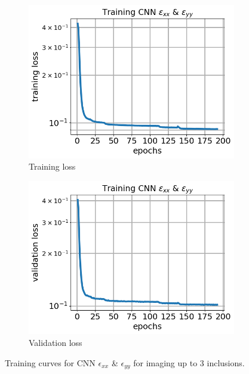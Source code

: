 \documentclass[12pt]{article}
\newcommand{\nhgfigheight}{4.0cm}
\begin{document}
\begin{figure}[h]
  \centering
  \begin{subfigure}[b]{0.45\linewidth}
    \includegraphics[totalheight=\nhgfigheight]{Figures/final3/training/exxeyy/field_strainxxyy_plot_loss.png}
    \caption{Training loss}
  \end{subfigure}
  \begin{subfigure}[b]{0.45\linewidth}
    \includegraphics[totalheight=\nhgfigheight]{Figures/final3/training/exxeyy/field_strainxxyy_plot_val_loss.png}
    \caption{Validation loss}
  \end{subfigure}
\caption{\label{fig:threeinc:trainexxeyy} Training curves for CNN $\epsilon_{xx}$ \& $\epsilon_{yy}$ for imaging up to 3 inclusions.}
\end{figure}
\end{document}
